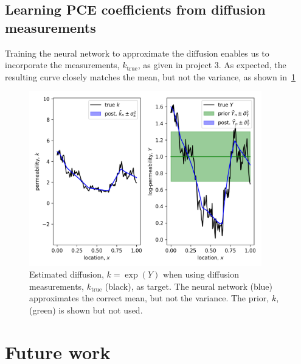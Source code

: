 \documentclass[letterpaper, 10 pt, conference, twocolumn]{ieeeconf}  %
\begin{document}
\subsection*{Learning PCE coefficients from diffusion measurements}
Training the neural network to approximate the diffusion enables us to incorporate the measurements, $k_\text{true}$, as given in project 3. As expected, the resulting curve closely matches the mean, but not the variance, as shown in~\cref{fig:est_k_true_nn} 
\begin{figure}[t]
    \centering
    \begin{minipage}[b]{0.7\linewidth}
    \centering\includegraphics [trim=0 0 0 0, clip, width=0.9\textwidth, angle = 0]{figures/est_k_true_nn/k_gp_vs_msmts}
    \end{minipage}%
\caption{Estimated diffusion, $k=\exp(Y)$ when using diffusion measurements, $k_\text{true}$ (black), as target. The neural network (blue) approximates the correct mean, but not the variance. The prior, $k$, (green) is shown but not used.}
\label{fig:est_k_true_nn}
\end{figure}
\section{Future work}
\end{document}
